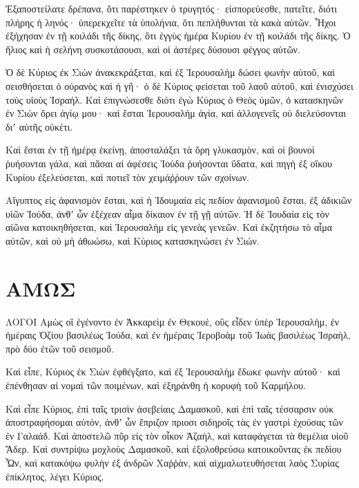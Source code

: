 \begin{spacing}{1.1}
\begin{multicols}{2}
Ἐξαποστείλατε δρέπανα, ὅτι παρέστηκεν ὁ τρυγητός· εἰσπορεύεσθε, πατεῖτε, διότι πλήρης ἡ ληνός· ὑπερεκχεῖτε τὰ ὑπολήνια, ὅτι πεπλήθυνται τὰ κακὰ αὐτῶν.
Ἦχοι ἐξήχησαν ἐν τῇ κοιλάδι τῆς δίκης, ὅτι ἐγγὺς ἡμέρα Κυρίου ἐν τῇ κοιλάδι τῆς δίκης.
Ὁ ἥλιος καὶ ἡ σελήνη συσκοτάσουσι, καὶ οἱ ἀστέρες δύσουσι φέγγος αὐτῶν.

Ὁ δὲ Κύριος ἐκ Σιὼν ἀνακεκράξεται, καὶ ἐξ Ἱερουσαλὴμ δώσει φωνὴν αὐτοῦ, καὶ σεισθήσεται ὁ οὐρανὸς καὶ ἡ γῆ· ὁ δὲ Κύριος φείσεται τοῦ λαοῦ αὐτοῦ, καὶ ἐνισχύσει τοὺς υἱοὺς Ἰσραήλ.
Καὶ ἐπιγνώσεσθε διότι ἐγὼ Κύριος ὁ Θεὸς ὑμῶν, ὁ κατασκηνῶν ἐν Σιὼν ὄρει ἁγίῳ μου· καὶ ἔσται Ἱερουσαλὴμ ἁγία, καὶ ἀλλογενεῖς οὐ διελεύσονται διʼ αὐτῆς οὐκέτι.

Καὶ ἔσται ἐν τῇ ἡμέρᾳ ἐκείνῃ, ἀποσταλάξει τὰ ὄρη γλυκασμὸν, καὶ οἱ βουνοὶ ῥυήσονται γάλα, καὶ πᾶσαι αἱ ἀφέσεις Ἰούδα ῥυήσονται ὕδατα, καὶ πηγὴ ἐξ οἴκου Κυρίου ἐξελεύσεται, καὶ ποτιεῖ τὸν χειμάῤῥουν τῶν σχοίνων.

Αἴγυπτος εἰς ἀφανισμὸν ἔσται, καὶ ἡ Ἰδουμαία εἰς πεδίον ἀφανισμοῦ ἔσται, ἐξ ἀδικιῶν υἱῶν Ἰούδα, ἀνθʼ ὧν ἐξέχεαν αἷμα δίκαιον ἐν τῇ γῇ αὐτῶν.
Ἡ δὲ Ἰουδαία εἰς τὸν αἰῶνα κατοικηθήσεται, καὶ Ἱερουσαλὴμ εἰς γενεὰς γενεῶν.
Καὶ ἐκζητήσω τὸ αἷμα αὐτῶν, καὶ οὐ μὴ ἀθωώσω, καὶ Κύριος κατασκηνώσει ἐν Σιών.


\end{multicols}
\chapter{ΑΜΩΣ}
\begin{multicols}{2}

ΛΟΓΟΙ Αμὼς οἳ ἐγένοντο ἐν Ἀκκαρεὶμ ἐν Θεκουὲ, οὓς εἶδεν ὑπὲρ Ἱερουσαλὴμ, ἐν ἡμέραις Ὀζίου βασιλέως Ἰούδα, καὶ ἐν ἡμέραις Ἱεροβοὰμ τοῦ Ἰωὰς βασιλέως Ἰσραὴλ, πρὸ δύο ἐτῶν τοῦ σεισμοῦ.

Καὶ εἶπε, Κύριος ἐκ Σιὼν ἐφθέγξατο, καὶ ἐξ Ἱερουσαλὴμ ἔδωκε φωνὴν αὐτοῦ· καὶ ἐπένθησαν αἱ νομαὶ τῶν ποιμένων, καὶ ἐξηράνθη ἡ κορυφὴ τοῦ Καρμήλου.

Καὶ εἶπε Κύριος, ἐπὶ ταῖς τρισὶν ἀσεβείαις Δαμασκοῦ, καὶ ἐπὶ ταῖς τέσσαρσιν οὐκ ἀποστραφήσομαι αὐτὸν, ἀνθʼ ὧν ἔπριζον πριοσι σιδηροῖς τὰς ἐν γαστρὶ ἐχούσας τῶν ἐν Γαλαάδ.
Καὶ ἀποστελῶ πῦρ εἰς τὸν οἶκον Ἀζαὴλ, καὶ καταφάγεται τὰ θεμέλια υἱοῦ Ἄδερ.
Καὶ συντρίψω μοχλοὺς Δαμασκοῦ, καὶ ἐξολοθρεύσω κατοικοῦντας ἐκ πεδίου Ὦν, καὶ κατακόψω φυλὴν ἐξ ἀνδρῶν Χαῤῥὰν, καὶ αἰχμαλωτευθήσεται λαὸς Συρίας ἐπίκλητος, λέγει Κύριος.


\end{multicols}
\end{spacing}
